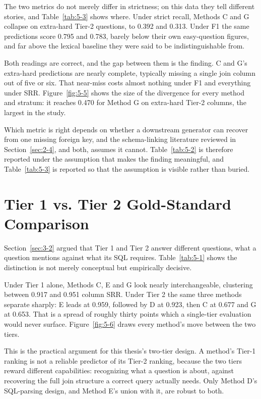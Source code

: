 The two metrics do not merely differ in strictness; on this data they tell different stories, and Table~\ref{tab:5-3} shows where. Under strict recall, Methods C and G collapse on extra-hard Tier-2 questions, to 0.392 and 0.313. Under F1 the same predictions score 0.795 and 0.783, barely below their own easy-question figures, and far above the lexical baseline they were said to be indistinguishable from.

Both readings are correct, and the gap between them is the finding. C and G's extra-hard predictions are nearly complete, typically missing a single join column out of five or six. That near-miss costs almost nothing under F1 and everything under SRR. Figure~\ref{fig:5-5} shows the size of the divergence for every method and stratum: it reaches 0.470 for Method G on extra-hard Tier-2 columns, the largest in the study.

Which metric is right depends on whether a downstream generator can recover from one missing foreign key, and the schema-linking literature reviewed in Section~\ref{sec:2-4}, \citet{cao2024} and \citet{katsogiannismeimarakis2026} both, assumes it cannot. Table~\ref{tab:5-2} is therefore reported under the assumption that makes the finding meaningful, and Table~\ref{tab:5-3} is reported so that the assumption is visible rather than buried.

\section{Tier 1 vs. Tier 2 Gold-Standard Comparison}\label{sec:5-3}

Section~\ref{sec:3-2} argued that Tier 1 and Tier 2 answer different questions, what a question mentions against what its SQL requires. Table~\ref{tab:5-1} shows the distinction is not merely conceptual but empirically decisive.

Under Tier 1 alone, Methods C, E and G look nearly interchangeable, clustering between 0.917 and 0.951 column SRR. Under Tier 2 the same three methods separate sharply: E leads at 0.959, followed by D at 0.923, then C at 0.677 and G at 0.653. That is a spread of roughly thirty points which a single-tier evaluation would never surface. Figure~\ref{fig:5-6} draws every method's move between the two tiers.

This is the practical argument for this thesis's two-tier design. A method's Tier-1 ranking is not a reliable predictor of its Tier-2 ranking, because the two tiers reward different capabilities: recognizing what a question is about, against recovering the full join structure a correct query actually needs. Only Method D's SQL-parsing design, and Method E's union with it, are robust to both.



